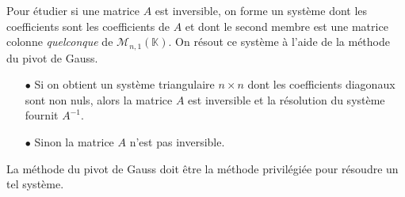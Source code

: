 \documentclass[french,11pt,twoside]{VcCours}
\begin{document}
\begin{Methode}{}
Pour étudier si une matrice $A$ est inversible, on forme un système dont les coefficients sont les coefficients de $A$ et dont le second membre est une matrice colonne \emph{quelconque} de $\mathcal{M}_{n,1}(\mathbb{K}).$ On résout ce système à l'aide de la méthode du pivot de Gauss. 
 \begin{enumerate}
  \item[$\bullet$]   Si on obtient un système triangulaire $n \times n$ dont les coefficients diagonaux sont non nuls, alors la matrice $A$ est inversible et la résolution du système fournit $A^{-1}$.
  \item[$\bullet$] Sinon la matrice $A$ n'est pas inversible. 
 \end{enumerate}
\end{Methode}

\begin{Remarque}{} La méthode du pivot de Gauss doit être la méthode privilégiée pour résoudre un tel système. 
\end{Remarque}
\end{document}
